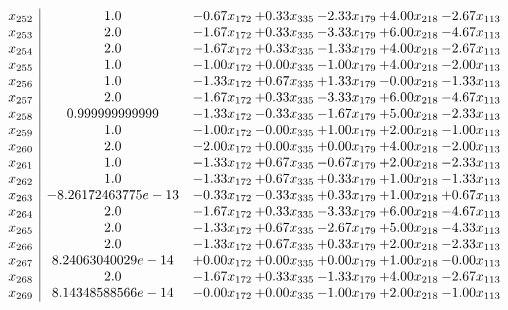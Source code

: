 \documentclass[8pt]{article}
\begin{document}
\[\begin{array}{c| c c@{\hskip 2pt} c@{\hskip 2pt} c@{\hskip 2pt} c@{\hskip 2pt} c@{\hskip 2pt} }
 x_{252}   &  1.0 & -0.67 x_{172} & +  0.33 x_{335} & -2.33 x_{179} & +  4.00 x_{218} & -2.67 x_{113}\\
 x_{253}   &  2.0 & -1.67 x_{172} & +  0.33 x_{335} & -3.33 x_{179} & +  6.00 x_{218} & -4.67 x_{113}\\
 x_{254}   &  2.0 & -1.67 x_{172} & +  0.33 x_{335} & -1.33 x_{179} & +  4.00 x_{218} & -2.67 x_{113}\\
 x_{255}   &  1.0 & -1.00 x_{172} & +  0.00 x_{335} & -1.00 x_{179} & +  4.00 x_{218} & -2.00 x_{113}\\
 x_{256}   &  1.0 & -1.33 x_{172} & +  0.67 x_{335} & +  1.33 x_{179} & -0.00 x_{218} & -1.33 x_{113}\\
 x_{257}   &  2.0 & -1.67 x_{172} & +  0.33 x_{335} & -3.33 x_{179} & +  6.00 x_{218} & -4.67 x_{113}\\
 x_{258}   &  0.999999999999 & -1.33 x_{172} & -0.33 x_{335} & -1.67 x_{179} & +  5.00 x_{218} & -2.33 x_{113}\\
 x_{259}   &  1.0 & -1.00 x_{172} & -0.00 x_{335} & +  1.00 x_{179} & +  2.00 x_{218} & -1.00 x_{113}\\
 x_{260}   &  2.0 & -2.00 x_{172} & +  0.00 x_{335} & +  0.00 x_{179} & +  4.00 x_{218} & -2.00 x_{113}\\
 x_{261}   &  1.0 & -1.33 x_{172} & +  0.67 x_{335} & -0.67 x_{179} & +  2.00 x_{218} & -2.33 x_{113}\\
 x_{262}   &  1.0 & -1.33 x_{172} & +  0.67 x_{335} & +  0.33 x_{179} & +  1.00 x_{218} & -1.33 x_{113}\\
 x_{263}   &  -8.26172463775e-13 & -0.33 x_{172} & -0.33 x_{335} & +  0.33 x_{179} & +  1.00 x_{218} & +  0.67 x_{113}\\
 x_{264}   &  2.0 & -1.67 x_{172} & +  0.33 x_{335} & -3.33 x_{179} & +  6.00 x_{218} & -4.67 x_{113}\\
 x_{265}   &  2.0 & -1.33 x_{172} & +  0.67 x_{335} & -2.67 x_{179} & +  5.00 x_{218} & -4.33 x_{113}\\
 x_{266}   &  2.0 & -1.33 x_{172} & +  0.67 x_{335} & +  0.33 x_{179} & +  2.00 x_{218} & -2.33 x_{113}\\
 x_{267}   &  8.24063040029e-14 & +  0.00 x_{172} & +  0.00 x_{335} & +  0.00 x_{179} & +  1.00 x_{218} & -0.00 x_{113}\\
 x_{268}   &  2.0 & -1.67 x_{172} & +  0.33 x_{335} & -1.33 x_{179} & +  4.00 x_{218} & -2.67 x_{113}\\
 x_{269}   &  8.14348588566e-14 & -0.00 x_{172} & +  0.00 x_{335} & -1.00 x_{179} & +  2.00 x_{218} & -1.00 x_{113}\\

\end{array}\]
\end{document}
